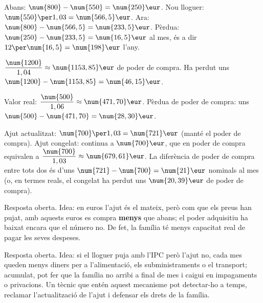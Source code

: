\begin{solucions}
\begin{sollist}
  \item Abans: $\num{800}-\num{550}=\num{250}\eur$. Nou lloguer:
        $\num{550}\per 1,03=\num{566,5}\eur$. Ara: $\num{800}-\num{566,5}=\num{233,5}\eur$.
        Pèrdua: $\num{250}-\num{233,5}=\num{16,5}\eur$ al mes, és a dir
        $12\per\num{16,5}=\num{198}\eur$ l'any.
  \item $\dfrac{\num{1200}}{1,04}\approx\num{1153,85}\eur$ de poder de compra. Ha perdut
        uns $\num{1200}-\num{1153,85}=\num{46,15}\eur$.
  \item Valor real: $\dfrac{\num{500}}{1,06}\approx\num{471,70}\eur$. Pèrdua de poder de
        compra: uns $\num{500}-\num{471,70}=\num{28,30}\eur$.
  \item Ajut actualitzat: $\num{700}\per 1,03=\num{721}\eur$ (manté el poder de compra).
        Ajut congelat: continua a $\num{700}\eur$, que en poder de compra equivalen a
        $\dfrac{\num{700}}{1,03}\approx\num{679,61}\eur$. La diferència de poder de
        compra entre tots dos és d'uns $\num{721}-\num{700}=\num{21}\eur$ nominals al
        mes (o, en termes reals, el congelat ha perdut uns $\num{20,39}\eur$ de poder de
        compra).
  \item Resposta oberta. Idea: en euros l'ajut és el mateix, però com que els preus han
        pujat, amb aquests euros es compra \textbf{menys} que abans; el poder
        adquisitiu ha baixat encara que el número no. De fet, la família té menys
        capacitat real de pagar les seves despeses.
  \item Resposta oberta. Idea: si el lloguer puja amb l'IPC però l'ajut no, cada mes
        queden menys diners per a l'alimentació, els subministraments o el transport;
        acumulat, pot fer que la família no arribi a final de mes i caigui en impagaments
        o privacions. Un tècnic que entén aquest mecanisme pot detectar-ho a temps,
        reclamar l'actualització de l'ajut i defensar els drets de la família.
\end{sollist}
\end{solucions}
